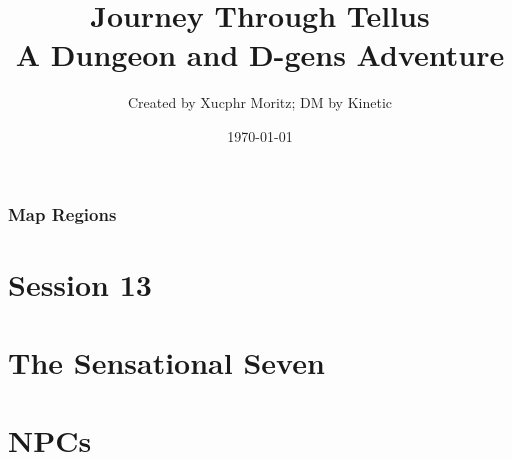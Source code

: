 \documentclass[letterpaper,twocolumn,openany,nodeprecatedcode]{dndbook}
\title{Journey Through Tellus \\
\large A Dungeon and D-gens Adventure}
\author{Created by Xucphr Moritz; DM by Kinetic}
\date{\today}
\begin{document}
\frontmatter

\maketitle

\tableofcontents

\mainmatter%



\section{Map Regions}







\part*{Session 13}


%

\part{The Sensational Seven}





\part{NPCs}



%
\end{document}
